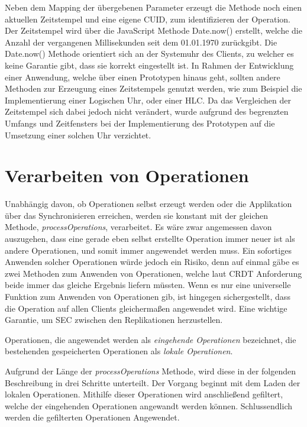 \documentclass[a4paper, 12pt]{scrreprt}
\begin{document}
Neben dem Mapping der übergebenen Parameter erzeugt die Methode noch einen aktuellen Zeitstempel und eine eigene CUID, zum identifizieren der Operation. Der Zeitstempel wird über die JavaScript Methode Date.now() erstellt, welche die Anzahl der vergangenen Millisekunden seit dem 01.01.1970 zurückgibt. Die Date.now() Methode orientiert sich an der Systemuhr des Clients, zu welcher es keine Garantie gibt, dass sie korrekt eingestellt ist. In Rahmen der Entwicklung einer Anwendung, welche über einen Prototypen hinaus geht, sollten andere Methoden zur Erzeugung eines Zeitstempels genutzt werden, wie zum Beispiel die Implementierung einer Logischen Uhr, oder einer \ac{HLC}. Da das Vergleichen der Zeitstempel sich dabei jedoch nicht verändert, wurde aufgrund des begrenzten Umfangs und Zeitfensters bei der Implementierung des Prototypen auf die Umsetzung einer solchen Uhr verzichtet.

\section{Verarbeiten von Operationen}
\label{sec:processOperations}

Unabhängig davon, ob Operationen selbst erzeugt werden oder die Applikation über das Synchronisieren erreichen, werden sie konstant mit der gleichen Methode, \textit{processOperations}, verarbeitet. Es wäre zwar angemessen davon auszugehen, dass eine gerade eben selbst erstellte Operation immer neuer ist als andere Operationen, und somit immer angewendet werden muss. Ein sofortiges Anwenden solcher Operationen würde jedoch ein Risiko, denn auf einmal gäbe es zwei Methoden zum Anwenden von Operationen, welche laut CRDT Anforderung beide immer das gleiche Ergebnis liefern müssten. Wenn es nur eine universelle Funktion zum Anwenden von Operationen gib, ist hingegen sichergestellt, dass die Operation auf allen Clients gleichermaßen angewendet wird. Eine wichtige Garantie, um \ac{SEC} zwischen den Replikationen herzustellen.

Operationen, die angewendet werden als \textit{eingehende Operationen} bezeichnet, die bestehenden gespeicherten Operationen als \textit{lokale Operationen}.

Aufgrund der Länge der \textit{processOperations} Methode, wird diese in der folgenden Beschreibung in drei Schritte unterteilt. Der Vorgang beginnt mit dem Laden der lokalen Operationen. Mithilfe dieser Operationen wird anschließend gefiltert, welche der eingehenden Operationen angewandt werden können. Schlussendlich werden die gefilterten Operationen Angewendet.
\end{document}
